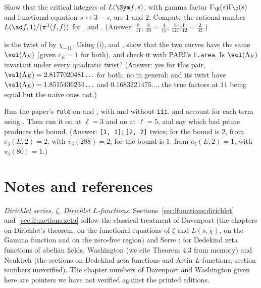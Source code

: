 \begin{exercise}\label{ex:lfunctions:ex-critical}
Show that the critical integers of $L(\Sym f,s)$, with gamma factor $\Gamma_\R(s)\Gamma_\C(s)$ and functional equation $s\leftrightarrow3-s$, are $1$ and $2$. Compute the rational number
$L(\ad f,1)/(\pi^3\langle f,f\rangle)$ for ,  and . (Answer: $\frac8{11}$, $\frac8{30}=\frac4{15}$, $\frac{8\cdot11}{121\cdot12}=\frac2{33}$.)
\end{exercise}

\begin{exercise}\label{ex:lfunctions:ex-twistvol}
 is the twist of  by $\chi_{-11}$. Using (i),  and , show that the two curves
have the same $\vol(\Lambda_E)$ (given $c_E=1$ for both), and check it with PARI's \texttt{E.area}. Is $\vol(\Lambda_E)$ invariant under every quadratic twist? (Answer: yes for this pair, $\vol(\Lambda_E)=2.8177020481\ldots$
for both; no in general:  and its twist  have $\vol(\Lambda_E)=1.8515436234\ldots$ and $0.1683221475\ldots$, the true factors at $11$ being equal but the naive
ones not.)
\end{exercise}

\begin{exercise}\label{ex:lfunctions:ex-rule}
Run the paper's \texttt{rule} on  and , with and without \texttt{iii}, and account for each term using . Then run it on  at
$\ell=3$ and on  at $\ell=5$, and say which bad prime produces the bound. (Answer: \texttt{[1, 1]}; \texttt{[2, 2]} twice; for  the bound is $2$, from $e_3(E,2)=2$, with
$v_3(288)=2$; for  the bound is $1$, from $e_5(E,2)=1$, with $v_5(80)=1$.)
\end{exercise}

\section{Notes and references}\label{sec:lfunctions:notes}

\emph{Dirichlet series, $\zeta$, Dirichlet $L$-functions.} Sections~\ref{sec:lfunctions:dirichlet} and~\ref{sec:lfunctions:zeta} follow the classical treatment of Davenport
\cite{Davenport00} (the chapters on Dirichlet's theorem, on the functional equations of $\zeta$ and $L(s,\chi)$, on the Gamma function and on the zero-free region) and
Serre \cite[Chapter VI]{SerreCourse}; for Dedekind zeta functions of abelian fields, Washington \cite[Chapter 4]{Washington} (we cite Theorem 4.3 from memory) and Neukirch
\cite[Chapter VII]{Neukirch} (the sections on Dedekind zeta functions and Artin $L$-functions; section numbers unverified). The chapter numbers of Davenport and
Washington given here are pointers we have not verified against the printed editions.

